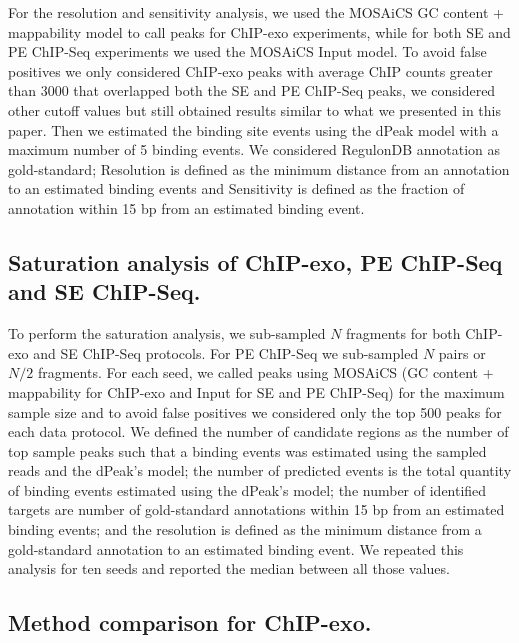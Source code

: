 \documentclass{bmcart}\usepackage[]{graphicx}\usepackage[]{color}
\begin{document}
For the resolution and sensitivity analysis, we used the MOSAiCS GC
content + mappability model to call peaks for ChIP-exo experiments,
while for both SE and PE ChIP-Seq experiments we used the MOSAiCS
Input model. To avoid false positives we only considered ChIP-exo
peaks with average ChIP counts greater than 3000 that overlapped both
the SE and PE ChIP-Seq peaks, we considered other cutoff values but
still obtained results similar to what we presented in this
paper. Then we estimated the binding site events using the dPeak model
with a maximum number of 5 binding events. We considered RegulonDB
annotation as gold-standard; Resolution is defined as the minimum
distance from an annotation to an estimated binding events and
Sensitivity is defined as the fraction of annotation within
15 bp from an estimated binding event.

\subsection*{Saturation analysis of ChIP-exo, PE ChIP-Seq and SE ChIP-Seq.}

To perform the saturation analysis, we sub-sampled $N$ fragments for
both ChIP-exo and SE ChIP-Seq protocols. For PE ChIP-Seq we
sub-sampled $N$ pairs or $N/2$ fragments. For each seed, we called
peaks using MOSAiCS \cite{mosaics} (GC content + mappability for
ChIP-exo and Input for SE and PE ChIP-Seq) for the maximum sample size
and to avoid false positives we considered only the top 500 peaks for
each data protocol. We defined the number of candidate regions as the
number of top sample peaks such that a binding events was estimated
using the sampled reads and the dPeak's model; the number of predicted
events is the total quantity of binding events estimated using the
dPeak's model; the number of identified targets are number of
gold-standard annotations within 15 bp from an estimated binding
events; and the resolution is defined as the minimum distance from a
gold-standard annotation to an estimated binding event. We repeated
this analysis for ten seeds and reported the median between all those
values.

\subsection*{Method comparison for ChIP-exo.}
\end{document}
